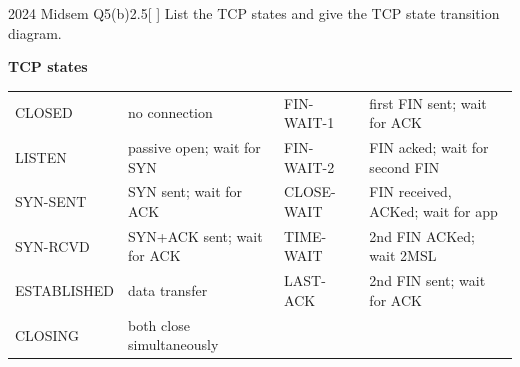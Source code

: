 \begin{question}{2024 Midsem Q5(b)}{2.5}[ ]
List the TCP states and give the TCP state transition diagram.
\end{question}
\label{q:MS2024-5b}
\begin{solution}
\textbf{TCP states} 

\smallskip
{\small\zebra
\begin{tabularx}{\linewidth}{L{23mm}YL{23mm}Y}\toprule
{} &  &  & \\\midrule
CLOSED & no connection & FIN-WAIT-1 & first FIN sent; wait for ACK\\
LISTEN & passive open; wait for SYN & FIN-WAIT-2 & FIN acked; wait for second FIN\\
SYN-SENT & SYN sent; wait for ACK & CLOSE-WAIT & FIN received, ACKed; wait for app\\
SYN-RCVD & SYN+ACK sent; wait for ACK & TIME-WAIT & 2nd FIN ACKed; wait 2MSL\\
ESTABLISHED & data transfer & LAST-ACK & 2nd FIN sent; wait for ACK\\
CLOSING & both close simultaneously & & \\\bottomrule
\end{tabularx}}


\end{solution}
